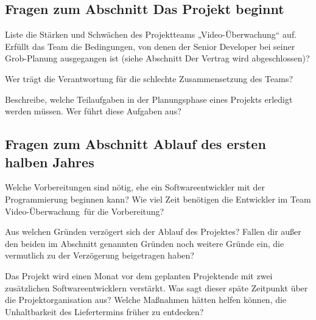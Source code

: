 \subsection*{Fragen zum Abschnitt \glqq Das Projekt beginnt\grqq}
\begin{compactenum}[a)]
\item Liste die Stärken und Schwächen des Projektteams „Video-Überwachung“ auf.
Erfüllt das Team die Bedingungen, von denen der Senior Developer bei seiner
Grob-Planung ausgegangen ist (siehe Abschnitt \glqq Der Vertrag wird
abgeschlossen\grqq)?
\item Wer trägt die Verantwortung für die schlechte Zusammensetzung des Teams?
\item Beschreibe, welche Teilaufgaben in der Planungsphase eines Projekts
erledigt werden müssen. Wer führt diese Aufgaben aus?
\end{compactenum}

\subsection*{Fragen zum Abschnitt \glqq Ablauf des ersten halben Jahres\grqq}
\begin{compactenum}[a)]
\item Welche Vorbereitungen sind nötig, ehe ein Softwareentwickler mit der
Programmierung beginnen kann? Wie viel Zeit benötigen die Entwickler im Team
\glqq Video-Überwachung\grqq\ für die Vorbereitung?
\item Aus welchen Gründen verzögert sich der Ablauf des Projektes? Fallen dir
außer den beiden im Abschnitt genannten Gründen noch weitere Gründe ein, die
vermutlich zu der Verzögerung beigetragen haben?
\item Das Projekt wird einen Monat vor dem geplanten Projektende mit zwei
zusätzlichen Softwareentwicklern verstärkt. Was sagt dieser späte Zeitpunkt
über die Projektorganisation aus? Welche Maßnahmen hätten helfen können, die
Unhaltbarkeit des Liefertermins früher zu entdecken?
\end{compactenum}

